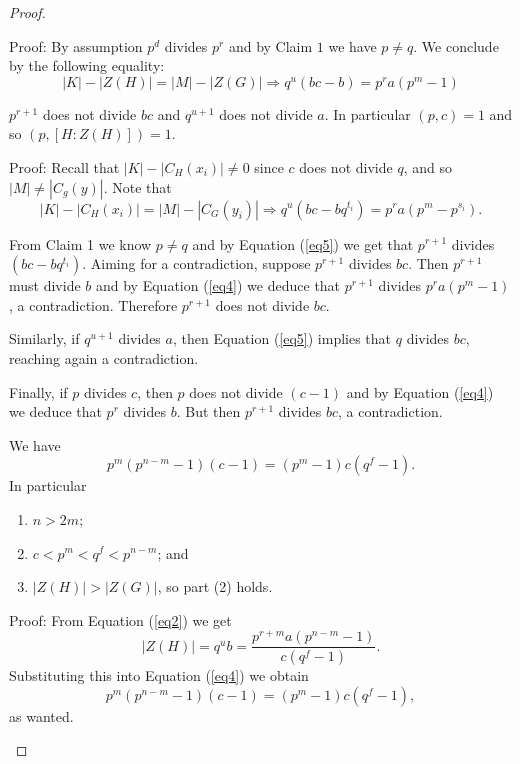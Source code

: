 \documentclass[12pt]{amsart}
\theoremstyle{definition}
\theoremstyle{remark}
\theoremstyle{plain}
\theoremstyle{plain}
\theoremstyle{plain}
\theoremstyle{plain}
\theoremstyle{plain}
\theoremstyle{remark}
\theoremstyle{remark}
\theoremstyle{definition}
\begin{document}
\begin{proof}
\begin{description}
\smallskip
\noindent
Proof: 
By assumption $p^d$ divides $p^r$ and by Claim $1$ we have $p\neq q$. We conclude by the following equality:
\begin{equation}\label{eq4} |K| - |Z(H)| = |M| - |Z(G)| 
\Longrightarrow  q^u( bc - b ) = p^ra(p^m - 1)\end{equation}



\bigskip
\item[Claim 3] $p^{r+1}$ does not divide $bc$ and $q^{u+1}$ does not divide $a$. In particular $(p,c)=1$ and so $(p,[H \colon Z(H)])=1$.

\smallskip
\noindent
Proof:  Recall that $|K| - |C_H(x_i)| \neq 0 $ since $c$ does not divide $q$,  and so  $|M| \neq |C_g(y)|$. Note that
\begin{equation}\label{eq5} |K| - |C_H(x_i)| = |M| - |C_G(y_i)| \Longrightarrow 
q^u(bc - bq^{t_i}) = p^ra(p^m - p^{s_i}). \end{equation}


From Claim 1 we know $p\neq q$ and by Equation (\ref{eq5}) we get that $p^{r+1}$ divides $(bc - bq^{t_i})$. 
Aiming for a contradiction, suppose $p^{r+1}$ divides $bc$. Then $p^{r+1}$ must divide $b$ and by Equation (\ref{eq4}) we deduce that $p^{r+1}$ divides $p^ra(p^m-1)$, a contradiction. Therefore $p^{r+1}$ does not divide $bc$.

Similarly, if $q^{u+1}$ divides $a$,  then Equation (\ref{eq5}) implies that $q$ divides $bc$, reaching again a contradiction.

Finally, if $p$ divides $c$, then $p$ does not divide $(c-1)$ and by Equation (\ref{eq4}) we deduce that $p^r$ divides $b$. But then $p^{r+1}$ divides $bc$, a contradiction.


\bigskip
\item[Claim 4] We have
\begin{equation}\label{eqC} p^{m}(p^{n-m}- 1)(c - 1)= (p^{m}- 1)c(q^f - 1).\end{equation} In particular 
\begin{enumerate}
\item $n > 2m$;
\item $c < p^m < q^f < p^{n-m}$; and
\item $|Z(H)| > |Z(G)|$, so part (2) holds.
\end{enumerate}

\smallskip
 \noindent
Proof: From Equation (\ref{eq2}) we get
\[ |Z(H)| = q^ub = \frac{p^{r+m}a(p^{n-m}- 1)}{c(q^f - 1)}.\]
Substituting this into Equation (\ref{eq4}) we obtain
$$ p^{m}(p^{n-m}- 1)(c - 1)= (p^{m}- 1)c(q^f - 1),$$
as wanted.


\end{description}
\end{proof}
\end{document}
